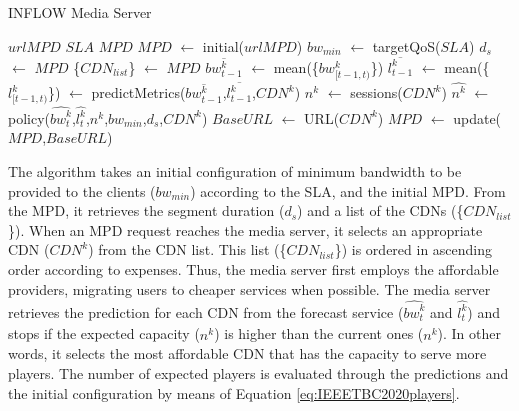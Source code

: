 \begin{algorithm}
	\renewcommand{\algorithmicrequire}{\textbf{Input:}}
	\renewcommand{\algorithmicensure}{\textbf{Output:}}
	\caption{INFLOW Media Server}
	\label{alg:IEEETBC2020algorithmServer}
	\begin{algorithmic}
		\State {}
		\Require $urlMPD$ 
		\Require $SLA$ 
		\Ensure $MPD$ 
		\State $MPD$ $\leftarrow$ initial($urlMPD$) 
		\State $bw_{min}$ $\leftarrow$ targetQoS($SLA$) 
		\State $d_{s}$ $\leftarrow$ $MPD$ 
		\State \{$CDN_{list}$\} $\leftarrow$ $MPD$ 
		 
		\State $\overline{bw_{t-1}^{k}}$ $\leftarrow$ mean(\{$bw_{[t-1,t)}^{k}$\}) 
		\State $\overline{l_{t-1}^{k}}$ $\leftarrow$ mean(\{$l_{[t-1,t)}^{k}$\})  
		 $\leftarrow$ predictMetrics($\overline{bw_{t-1}^{k}}$,$\overline{l_{t-1}^{k}}$,$CDN^{k}$)
		\State $n^{k}$ $\leftarrow$ sessions($CDN^{k}$) 
		\State $\widehat{n^{k}}$ $\leftarrow$ policy($\widehat{{bw}_{t}^{k}}$,$\widehat{{l}_{t}^{k}}$,$n^{k}$,$bw_{min}$,$d_{s}$,$CDN^{k}$)
		\State {}
		 
		\State $BaseURL$ $\leftarrow$ URL($CDN^{k}$)
		\State {}
		\State $MPD$ $\leftarrow$ update($MPD$,$BaseURL$)
		\State {}
		\EndIf
		\EndFor
		\EndFunction
	\end{algorithmic}
\end{algorithm}

The algorithm takes an initial configuration of minimum bandwidth to be provided to the clients ($bw_{min}$) according to the SLA, and the initial MPD. From the MPD, it retrieves the segment duration ($d_{s}$) and a list of the CDNs (\{$CDN_{list}$\}). When an MPD request reaches the media server, it selects an appropriate CDN ($CDN^{k}$) from the CDN list. This list (\{$CDN_{list}$\}) is ordered in ascending order according to expenses. Thus, the media server first employs the affordable providers, migrating users to cheaper services when possible. The media server retrieves the prediction for each CDN from the forecast service ($\widehat{{bw}_{t}^{k}}$ and $\widehat{{l}_{t}^{k}}$) and stops if the expected capacity ($\widehat{n^{k}}$) is higher than the current ones ($n^{k}$). In other words, it selects the most affordable CDN that has the capacity to serve more players. The number of expected players is evaluated through the predictions and the initial configuration by means of Equation \ref{eq:IEEETBC2020players}.

